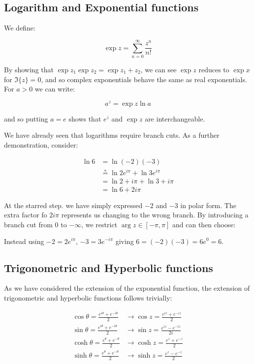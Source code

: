 \documentclass{physics_notes}
\begin{document}
\subsection{Logarithm and Exponential functions }

We define:

\[\exp{z} = \sum_{n=0}^\infty \frac{z^n}{n!} \]

By showing that $\exp{z_1}\exp{z_2} = \exp{z_1 + z_2}$, we can see $\exp{z}$ reduces to $\exp{x}$ for $\Im\{z\} = 0$, and so complex exponentials behave the same as real exponentials. For $a > 0$ we can write:

\[ a^z = \exp{z\ln{a}} \]

and so putting $a = e$ shows that $e^z$ and $\exp{z}$ are interchangeable.

We have already seen that logarithms require branch cuts. As a further demonstration, consider:

\begin{align*}
\ln{6} &= \ln{(-2)(-3)} \\
&\stackrel{*}{=} \ln{2e^{i\pi}} + \ln{3e^{i\pi}} \\
&= \ln{2} + i\pi + \ln{3} + i\pi \\
&= \ln{6} + 2i\pi
\end{align*}

At the starred step. we have simply expressed $-2$ and $-3$ in polar form. The extra factor fo $2i\pi$ represents us changing to the wrong branch. By introducing a branch cut from $0$ to $-\infty$, we restrict $\arg{z} \in [-\pi,\pi]$ and can then choose:

Instead using $-2 = 2e^{i\pi}$, $-3 = 3e^{-i\pi}$ giving $6 = (-2)(-3) = 6e^{0} = 6$.

\subsection{Trigonometric and Hyperbolic functions}

As we have considered the extension of the exponential function, the extension of trigonometric and hyperbolic functions follows trivially:

\begin{align*}
\cos{\theta} = \frac{e^{i\theta} + e^{-i\theta}}{2} &\longrightarrow \cos{z} = \frac{e^{iz} + e^{-iz}}{2}\\
\sin{\theta} = \frac{e^{i\theta} + e^{-i\theta}}{2} &\longrightarrow \sin{z} = \frac{e^{iz} - e^{-iz}}{2i}\\
\cosh{\theta} = \frac{e^{\theta} + e^{-\theta}}{2} &\longrightarrow \cosh{z} = \frac{e^{z} + e^{-z}}{2}\\
\sinh{\theta} = \frac{e^{\theta} + e^{-\theta}}{2} &\longrightarrow \sinh{z} = \frac{e^{z} - e^{-z}}{2}
\end{align*}
\end{document}
